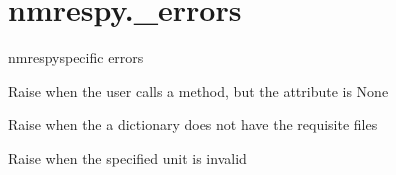 \documentclass[letterpaper,10pt,english]{sphinxmanual}
\begin{document}
\section{nmrespy.\_errors}
\label{\detokenize{references/errors:module-nmrespy._errors}}\label{\detokenize{references/errors:nmrespy-errors}}\label{\detokenize{references/errors::doc}}
\sphinxAtStartPar
nmrespy\sphinxhyphen{}specific errors

\begin{fulllineitems}
\label{\detokenize{references/errors:nmrespy._errors.AttributeIsNoneError}}
\sphinxAtStartPar
Raise when the user calls a  method, but the attribute
is None

\end{fulllineitems}


\begin{fulllineitems}
\label{\detokenize{references/errors:nmrespy._errors.InvalidDirectoryError}}
\sphinxAtStartPar
Raise when the a dictionary does not have the requisite files

\end{fulllineitems}


\begin{fulllineitems}
\label{\detokenize{references/errors:nmrespy._errors.InvalidUnitError}}
\sphinxAtStartPar
Raise when the specified unit is invalid

\end{fulllineitems}

\end{document}
